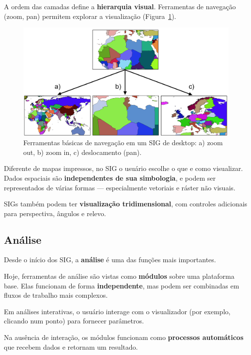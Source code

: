 A ordem das camadas define a \textbf{hierarquia visual}. Ferramentas de navegação (zoom, pan) permitem explorar a visualização (Figura~\ref{Fig:Herramientas_navegacion}).

\begin{figure}[!hbt]
\centering
\includegraphics[width=.99\textwidth]{Software/Herramientas_navegacion.png}
\caption{\small Ferramentas básicas de navegação em um SIG de desktop: a) zoom out, b) zoom in, c) deslocamento (pan).}
\label{Fig:Herramientas_navegacion} 
\end{figure}

Diferente de mapas impressos, no SIG o usuário escolhe o que e como visualizar. Dados espaciais são \textbf{independentes de sua simbologia}, e podem ser representados de várias formas — especialmente vetoriais e ráster não visuais.

SIGs também podem ter \textbf{visualização tridimensional}, com controles adicionais para perspectiva, ângulos e relevo.

\subsection{Análise}

Desde o início dos SIG, a \textbf{análise} é uma das funções mais importantes.

Hoje, ferramentas de análise são vistas como \textbf{módulos} sobre uma plataforma base. Elas funcionam de forma \textbf{independente}, mas podem ser combinadas em fluxos de trabalho mais complexos.

Em análises interativas, o usuário interage com o visualizador (por exemplo, clicando num ponto) para fornecer parâmetros.

Na ausência de interação, os módulos funcionam como \textbf{processos automáticos} que recebem dados e retornam um resultado.

